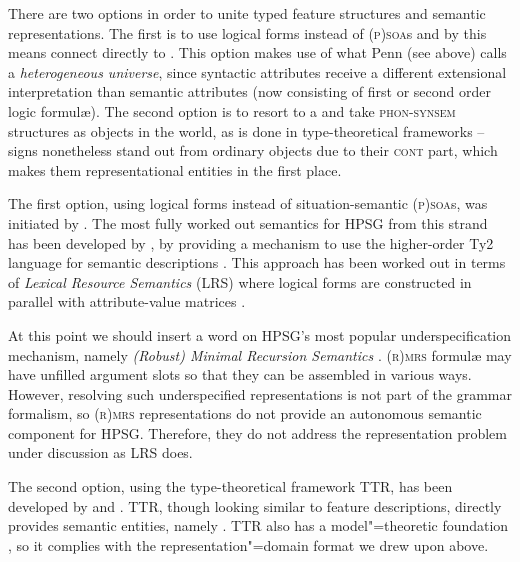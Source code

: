 \documentclass[output=paper
 	        ,biblatex
                ,babelshorthands
                ,newtxmath
                ,draftmode
                ,colorlinks, citecolor=brown
]{langscibook}
\begin{document}
There are two options in order to unite typed feature structures and semantic representations.
%
The first is to use logical forms instead of \textsc{(p)soa}s and by this means connect directly to .
%
This option makes use of what Penn (see above) calls a \emph{heterogeneous universe}, since syntactic attributes receive a different extensional interpretation than  semantic attributes (now consisting of first or second order logic formul{\ae}).
%
The second option is to resort to a  and take \textsc{phon-synsem} structures as objects in the world, as is done in type-theoretical frameworks -- signs nonetheless stand out from ordinary objects due to their \textsc{cont} part, which makes them representational entities in the first place.



The first option, using logical forms instead of situation-semantic \textsc{(p)soa}s, was initiated by \citet{Nerbonne:1992}. 
%
The most fully worked out semantics for HPSG from this strand has been developed by \citeauthor{Richter:Sailer:1999:a}, by providing a mechanism to use the higher-order Ty2 language for semantic descriptions \citep{Richter:Sailer:1999:a}.
%
This approach has been worked out in terms of \emph{Lexical Resource Semantics} (LRS) %
where logical forms are constructed in parallel with attribute-value matrices \citep{Richter:Sailer:04}.


At this point we should insert a word on HPSG's most popular underspecification mechanism, namely \emph{(Robust) Minimal Recursion Semantics} \citep*{Copestake:Flickinger:Pollard:Sag:2005,Copestake:2007}.
%
\textsc{(r)mrs} formul{\ae} may have unfilled argument slots so that they can be assembled in various ways.
%
However, resolving such underspecified representations is not part of the grammar formalism, so \textsc{(r)mrs} representations do not provide an autonomous semantic component for HPSG.
%
Therefore, they do not address the representation problem under discussion as LRS does. 


The second option, using the type-theoretical framework TTR, has been developed by \citet{Cooper:2008,Cooper:2014:a,Cooper:ms} and \citet{Ginzburg:2012}.
%
TTR, though looking similar to feature descriptions, directly provides semantic entities, namely  \citep[Sec.~5.2.2]{Ginzburg:2012}.
%
TTR also has a model"=theoretic foundation \citep{Cooper:ms}, so it complies with the representation"=domain format we drew upon above.
\end{document}
